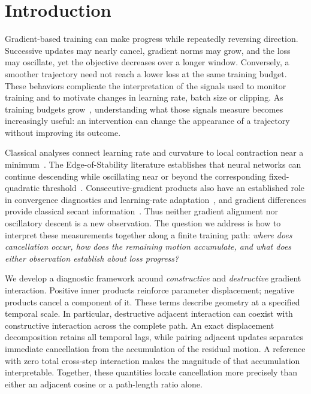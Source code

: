 \section{Introduction}

Gradient-based training can make progress while repeatedly reversing direction.
Successive updates may nearly cancel, gradient norms may grow, and the loss may
oscillate, yet the objective decreases over a longer window. Conversely, a
smoother trajectory need not reach a lower loss at the same training budget.
These behaviors complicate the interpretation of the signals used to monitor
training and to motivate changes in learning rate, batch size or clipping.
As training budgets grow~\cite{kaplan2020scaling,hoffmann2022chinchilla},
understanding what those signals measure becomes increasingly useful: an
intervention can change the appearance of a trajectory without improving its
outcome.

Classical analyses connect learning rate and curvature to local contraction
near a minimum~\cite{polyak1964methods,bertsekas1997nonlinear}. The
Edge-of-Stability literature establishes that neural networks can continue
descending while oscillating near or beyond the corresponding fixed-quadratic
threshold~\cite{cohen2021edge,arora2022understanding,damian2023self}.
Consecutive-gradient products also have an established role in convergence
diagnostics and learning-rate adaptation~\cite{chee2018diagnostics,
pesme2020diagnostics,baydin2018hypergradient}, and gradient differences provide
classical secant information~\cite{barzilai1988two}. Thus neither gradient
alignment nor oscillatory descent is a new observation. The question we address
is how to interpret these measurements together along a finite training path:
\emph{where does cancellation occur, how does the remaining motion accumulate,
and what does either observation establish about loss progress?}

We develop a diagnostic framework around \emph{constructive} and
\emph{destructive} gradient interaction. Positive inner products reinforce
parameter displacement; negative products cancel a component of it. These
terms describe geometry at a specified temporal scale. In particular,
destructive adjacent interaction can coexist with constructive interaction
across the complete path. An exact displacement decomposition retains all
temporal lags, while pairing adjacent updates separates immediate cancellation
from the accumulation of the residual motion. A reference with zero total
cross-step interaction makes the magnitude of that accumulation interpretable.
Together, these quantities locate cancellation more precisely than either an
adjacent cosine or a path-length ratio alone.

